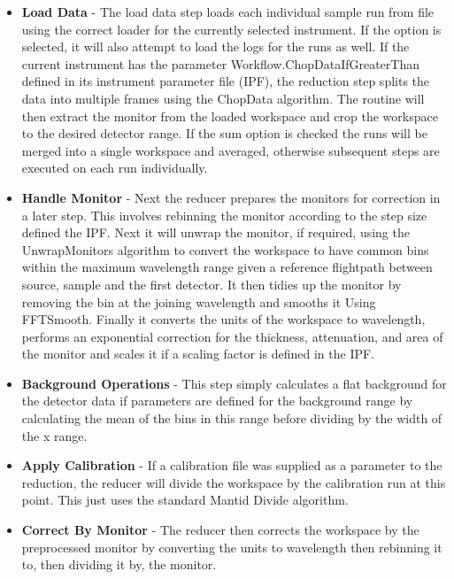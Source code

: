 \documentclass[paper=a4, fontsize=11pt]{scrartcl}	%
\numberwithin{equation}{section}															%
\numberwithin{figure}{section}																%
\numberwithin{table}{section}																%
\begin{document}
\begin{itemize}
\item \textbf{Load Data} - The load data step loads each individual sample run from file using the correct loader for the currently selected instrument. If the option is selected, it will also attempt to load the logs for the runs as well. If the current instrument has the parameter Workflow.ChopDataIfGreaterThan defined  in its instrument parameter file (IPF), the reduction step splits the data into multiple frames using the ChopData algorithm. The routine will then extract the monitor from the loaded workspace and crop the workspace to the desired detector range. If the sum option is checked the runs will be merged into a single workspace and averaged, otherwise subsequent steps are executed on each run individually.

\item \textbf{Handle Monitor} - Next the reducer prepares the monitors for correction in a later step. This involves rebinning the monitor according to the step size defined the IPF. Next it will unwrap the monitor, if required, using the UnwrapMonitors algorithm to convert the workspace to have common bins within the maximum wavelength range given a reference flightpath between source, sample and the first detector. It then tidies up the monitor by removing the bin at the joining wavelength and smooths it Using FFTSmooth. Finally it converts the units of the workspace to wavelength, performs an exponential correction for the thickness, attenuation, and area of the monitor and scales it if a scaling factor is defined in the IPF.

\item \textbf{Background Operations} - This step simply calculates a flat background for the detector data if parameters are defined for the background range by calculating the mean of the bins in this range before dividing by the width of the x range.

\item \textbf{Apply Calibration} - If a calibration file was supplied as a parameter to the reduction, the reducer will divide the workspace by the calibration run at this point. This just uses the standard Mantid Divide algorithm.

\item \textbf{Correct By Monitor} - The reducer then corrects the workspace by the preprocessed monitor by converting the units to wavelength then rebinning it to, then dividing it by, the monitor.


\end{itemize}
\end{document}

